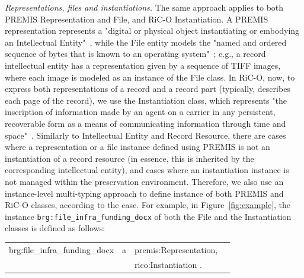 \documentclass[runningheads]{llncs}
\makeatletter
\newenvironment{rdfexpressions}
{%
	\par
	\begingroup
	\centering
	\ttfamily
	\begin{tabular}{@{}r@{\ }l@{\ }l@{}l@{}}
	}
	{%
	\end{tabular}
	\par
	\endgroup
}
\makeatother
\begin{document}
	\emph{Representations, files and instantiations.}
	The same approach applies to both 
	PREMIS Representation and File, and RiC-O Instantiation.
	A PREMIS representation represents a "digital or physical object instantiating or embodying an Intellectual Entity"~\cite{premis_data_dictionary_2015}, while the File entity models the "named and ordered sequence of bytes that is known to an operating system"~\cite{premis_data_dictionary_2015}; e.g., a record intellectual entity has a representation given by a sequence of TIFF images, where each image is modeled as an instance of the File class. In RiC-O, now, to express both representations of a record and a record part (typically, describes each page of the record), we use the Instantiation class, which represents "the inscription of information made by an agent on a carrier in any persistent, recoverable form as a means of communicating information through time and space"~\cite{RiCO,clavaud2021ica}. Similarly to Intellectual Entity and Record Resource, there are cases where a representation or a file instance defined using PREMIS is not an instantiation of a record resource (in essence, this is inherited by the corresponding intellectual entity), and cases where an instantiation instance is not managed within the preservation environment. Therefore, we also use an instance-level multi-typing approach to define instance of both PREMIS and RiC-O classes, according to the case. For example, in Figure~\ref{fig:example}, the instance \texttt{brg:file\_infra\_funding\_docx} of both the File and the Instantiation classes is defined as follows:
	\begin{rdfexpressions}
		brg:file\_infra\_funding\_docx & a & premis:Representation, & \\
		& & rico:Instantiation .
	\end{rdfexpressions}
	
\end{document}
